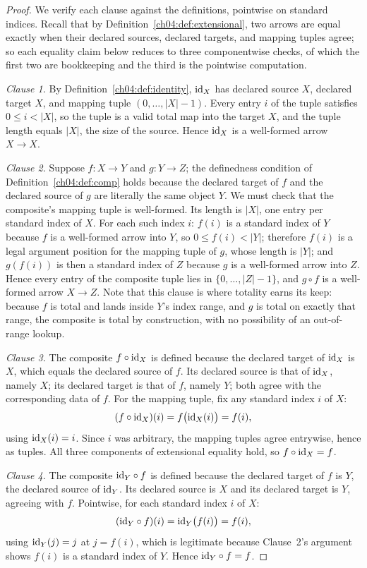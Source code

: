 \begin{proof}
We verify each clause against the definitions, pointwise on standard
indices. Recall that by Definition~\ref{ch04:def:extensional}, two arrows
are equal exactly when their declared sources, declared targets, and mapping
tuples agree; so each equality claim below reduces to three componentwise
checks, of which the first two are bookkeeping and the third is the
pointwise computation.

\emph{Clause 1.} By Definition~\ref{ch04:def:identity}, $\mathrm{id}_X$ has declared
source $X$, declared target $X$, and mapping tuple $(0, \dots, |X|-1)$.
Every entry $i$ of the tuple satisfies $0 \le i < |X|$, so the tuple is a
valid total map into the target $X$, and the tuple length equals $|X|$, the
size of the source. Hence $\mathrm{id}_X$ is a well-formed arrow $X \to X$.

\emph{Clause 2.} Suppose $f : X \to Y$ and $g : Y \to Z$; the definedness
condition of Definition~\ref{ch04:def:comp} holds because the declared
target of $f$ and the declared source of $g$ are literally the same object
$Y$. We must check that the composite's mapping tuple is well-formed. Its
length is $|X|$, one entry per standard index of $X$. For each such index
$i$: $f(i)$ is a standard index of $Y$ because $f$ is a well-formed arrow
into $Y$, so $0 \le f(i) < |Y|$; therefore $f(i)$ is a legal argument
position for the mapping tuple of $g$, whose length is $|Y|$; and
$g(f(i))$ is then a standard index of $Z$ because $g$ is a well-formed arrow
into $Z$. Hence every entry of the composite tuple lies in
$\{0, \dots, |Z|-1\}$, and $g \circ f$ is a well-formed arrow $X \to Z$.
Note that this clause is where totality earns its keep: because $f$ is total
and lands inside $Y$'s index range, and $g$ is total on exactly that range,
the composite is total by construction, with no possibility of an
out-of-range lookup.

\emph{Clause 3.} The composite $f \circ \mathrm{id}_X$ is defined because the
declared target of $\mathrm{id}_X$ is $X$, which equals the declared source of $f$.
Its declared source is that of $\mathrm{id}_X$, namely $X$; its declared target is
that of $f$, namely $Y$; both agree with the corresponding data of $f$. For
the mapping tuple, fix any standard index $i$ of $X$:
\[
  (f \circ \mathrm{id}_X)(i) = f\bigl(\mathrm{id}_X(i)\bigr) = f(i),
\]
using $\mathrm{id}_X(i) = i$. Since $i$ was arbitrary, the mapping tuples agree
entrywise, hence as tuples. All three components of extensional equality
hold, so $f \circ \mathrm{id}_X = f$.

\emph{Clause 4.} The composite $\mathrm{id}_Y \circ f$ is defined because the
declared target of $f$ is $Y$, the declared source of $\mathrm{id}_Y$. Its declared
source is $X$ and its declared target is $Y$, agreeing with $f$. Pointwise,
for each standard index $i$ of $X$:
\[
  (\mathrm{id}_Y \circ f)(i) = \mathrm{id}_Y\bigl(f(i)\bigr) = f(i),
\]
using $\mathrm{id}_Y(j) = j$ at $j = f(i)$, which is legitimate because Clause~2's
argument shows $f(i)$ is a standard index of $Y$. Hence
$\mathrm{id}_Y \circ f = f$.


\end{proof}

